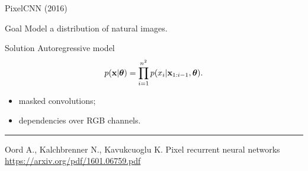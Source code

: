 \begin{frame}{PixelCNN (2016)}
\begin{block}{Goal}
Model a distribution of natural images.
\end{block}
\begin{block}{Solution}
Autoregressive model
\[
    p(\mathbf{x} | \boldsymbol{\theta}) = \prod_{i=1}^{n^2} p(x_i|\mathbf{x}_{1:i-1}, \boldsymbol{\theta}).
\]
\begin{itemize}
    \item masked convolutions;
    \item dependencies over RGB channels.
\end{itemize}
\end{block}
\vfill
\hrule\medskip
{\scriptsize Oord A., Kalchbrenner N., Kavukcuoglu K. Pixel recurrent neural networks \href{https://arxiv.org/pdf/1601.06759.pdf}{https://arxiv.org/pdf/1601.06759.pdf}}
\end{frame}
